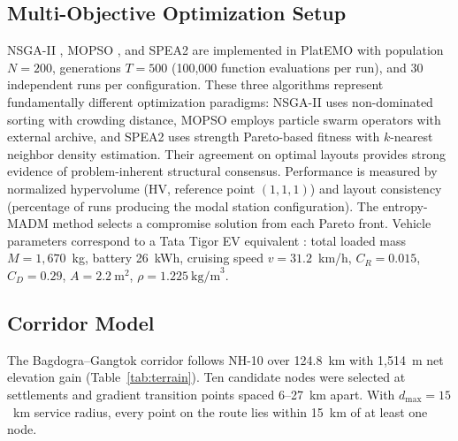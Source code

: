 \documentclass[conference]{IEEEtran}
\begin{document}
\subsection{Multi-Objective Optimization Setup}

NSGA-II \cite{20}, MOPSO \cite{21}, and SPEA2 \cite{22} are implemented in PlatEMO \cite{30} with population $N = 200$, generations $T = 500$ (100,000 function evaluations per run), and 30 independent runs per configuration. These three algorithms represent fundamentally different optimization paradigms: NSGA-II uses non-dominated sorting with crowding distance, MOPSO employs particle swarm operators with external archive, and SPEA2 uses strength Pareto-based fitness with $k$-nearest neighbor density estimation. Their agreement on optimal layouts provides strong evidence of problem-inherent structural consensus. Performance is measured by normalized hypervolume (HV, reference point $(1,1,1)$) and layout consistency (percentage of runs producing the modal station configuration). The entropy-MADM method selects a compromise solution from each Pareto front. Vehicle parameters correspond to a Tata Tigor EV equivalent \cite{31}: total loaded mass $M = 1{,}670$~kg, battery 26~kWh, cruising speed $v = 31.2$~km/h, $C_R = 0.015$, $C_D = 0.29$, $A = 2.2~\text{m}^2$, $\rho = 1.225~\text{kg/m}^3$.

\subsection{Corridor Model}

The Bagdogra--Gangtok corridor follows NH-10 over 124.8~km with 1{,}514~m net elevation gain (Table~\ref{tab:terrain}). Ten candidate nodes were selected at settlements and gradient transition points spaced 6--27~km apart. With $d_{\max} = 15$~km service radius, every point on the route lies within 15~km of at least one node.
\end{document}
